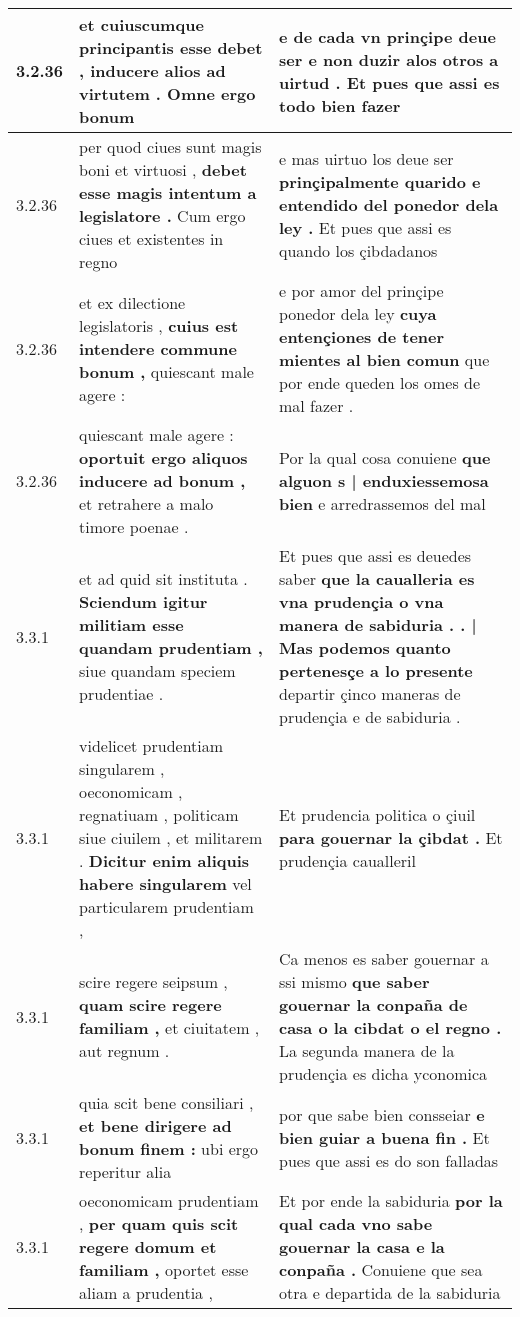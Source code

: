 \begin{tabular}{|p{1cm}|p{6.5cm}|p{6.5cm}|}
3.2.36 & et cuiuscumque principantis esse debet , \textbf{ inducere alios ad virtutem . } Omne ergo bonum & e de cada vn prinçipe deue ser \textbf{ e non duzir alos otros a uirtud . } Et pues que assi es todo bien fazer \\\hline
3.2.36 & per quod ciues sunt magis boni et virtuosi , \textbf{ debet esse magis intentum a legislatore . } Cum ergo ciues et existentes in regno & e mas uirtuo los deue ser \textbf{ prinçipalmente quarido e entendido del ponedor dela ley . } Et pues que assi es quando los çibdadanos \\\hline
3.2.36 & et ex dilectione legislatoris , \textbf{ cuius est intendere commune bonum , } quiescant male agere : & e por amor del prinçipe ponedor dela ley \textbf{ cuya entençiones de tener mientes al bien comun } que por ende queden los omes de mal fazer . \\\hline
3.2.36 & quiescant male agere : \textbf{ oportuit ergo aliquos inducere ad bonum , } et retrahere a malo timore poenae . & Por la qual cosa conuiene \textbf{ que alguon s | enduxiessemosa bien } e arredrassemos del mal \\\hline
3.3.1 & et ad quid sit instituta . \textbf{ Sciendum igitur militiam esse quandam prudentiam , } siue quandam speciem prudentiae . & Et pues que assi es deuedes saber \textbf{ que la caualleria es vna prudençia o vna manera de sabiduria . . | Mas podemos quanto pertenesçe a lo presente } departir çinco maneras de prudençia e de sabiduria . \\\hline
3.3.1 & videlicet prudentiam singularem , oeconomicam , regnatiuam , politicam siue ciuilem , et militarem . \textbf{ Dicitur enim aliquis habere singularem } vel particularem prudentiam , & Et prudencia politica o çiuil \textbf{ para gouernar la çibdat . } Et prudençia caualleril \\\hline
3.3.1 & scire regere seipsum , \textbf{ quam scire regere familiam , } et ciuitatem , aut regnum . & Ca menos es saber gouernar a ssi mismo \textbf{ que saber gouernar la conpaña de casa o la cibdat o el regno . } La segunda manera de la prudençia es dicha yconomica \\\hline
3.3.1 & quia scit bene consiliari , \textbf{ et bene dirigere ad bonum finem : } ubi ergo reperitur alia & por que sabe bien consseiar \textbf{ e bien guiar a buena fin . } Et pues que assi es do son falladas \\\hline
3.3.1 & oeconomicam prudentiam , \textbf{ per quam quis scit regere domum et familiam , } oportet esse aliam a prudentia , & Et por ende la sabiduria \textbf{ por la qual cada vno sabe gouernar la casa e la conpaña . } Conuiene que sea otra e departida de la sabiduria \\\hline

\end{tabular}
